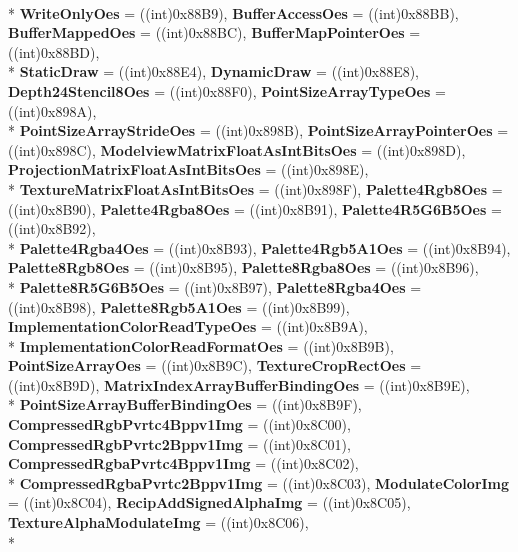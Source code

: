 \begin{DoxyCompactItemize}
\\*
{\bfseries Write\-Only\-Oes} = ((int)0x88\-B9), 
{\bfseries Buffer\-Access\-Oes} = ((int)0x88\-B\-B), 
{\bfseries Buffer\-Mapped\-Oes} = ((int)0x88\-B\-C), 
{\bfseries Buffer\-Map\-Pointer\-Oes} = ((int)0x88\-B\-D), 
\\*
{\bfseries Static\-Draw} = ((int)0x88\-E4), 
{\bfseries Dynamic\-Draw} = ((int)0x88\-E8), 
{\bfseries Depth24\-Stencil8\-Oes} = ((int)0x88\-F0), 
{\bfseries Point\-Size\-Array\-Type\-Oes} = ((int)0x898\-A), 
\\*
{\bfseries Point\-Size\-Array\-Stride\-Oes} = ((int)0x898\-B), 
{\bfseries Point\-Size\-Array\-Pointer\-Oes} = ((int)0x898\-C), 
{\bfseries Modelview\-Matrix\-Float\-As\-Int\-Bits\-Oes} = ((int)0x898\-D), 
{\bfseries Projection\-Matrix\-Float\-As\-Int\-Bits\-Oes} = ((int)0x898\-E), 
\\*
{\bfseries Texture\-Matrix\-Float\-As\-Int\-Bits\-Oes} = ((int)0x898\-F), 
{\bfseries Palette4\-Rgb8\-Oes} = ((int)0x8\-B90), 
{\bfseries Palette4\-Rgba8\-Oes} = ((int)0x8\-B91), 
{\bfseries Palette4\-R5\-G6\-B5\-Oes} = ((int)0x8\-B92), 
\\*
{\bfseries Palette4\-Rgba4\-Oes} = ((int)0x8\-B93), 
{\bfseries Palette4\-Rgb5\-A1\-Oes} = ((int)0x8\-B94), 
{\bfseries Palette8\-Rgb8\-Oes} = ((int)0x8\-B95), 
{\bfseries Palette8\-Rgba8\-Oes} = ((int)0x8\-B96), 
\\*
{\bfseries Palette8\-R5\-G6\-B5\-Oes} = ((int)0x8\-B97), 
{\bfseries Palette8\-Rgba4\-Oes} = ((int)0x8\-B98), 
{\bfseries Palette8\-Rgb5\-A1\-Oes} = ((int)0x8\-B99), 
{\bfseries Implementation\-Color\-Read\-Type\-Oes} = ((int)0x8\-B9\-A), 
\\*
{\bfseries Implementation\-Color\-Read\-Format\-Oes} = ((int)0x8\-B9\-B), 
{\bfseries Point\-Size\-Array\-Oes} = ((int)0x8\-B9\-C), 
{\bfseries Texture\-Crop\-Rect\-Oes} = ((int)0x8\-B9\-D), 
{\bfseries Matrix\-Index\-Array\-Buffer\-Binding\-Oes} = ((int)0x8\-B9\-E), 
\\*
{\bfseries Point\-Size\-Array\-Buffer\-Binding\-Oes} = ((int)0x8\-B9\-F), 
{\bfseries Compressed\-Rgb\-Pvrtc4\-Bppv1\-Img} = ((int)0x8\-C00), 
{\bfseries Compressed\-Rgb\-Pvrtc2\-Bppv1\-Img} = ((int)0x8\-C01), 
{\bfseries Compressed\-Rgba\-Pvrtc4\-Bppv1\-Img} = ((int)0x8\-C02), 
\\*
{\bfseries Compressed\-Rgba\-Pvrtc2\-Bppv1\-Img} = ((int)0x8\-C03), 
{\bfseries Modulate\-Color\-Img} = ((int)0x8\-C04), 
{\bfseries Recip\-Add\-Signed\-Alpha\-Img} = ((int)0x8\-C05), 
{\bfseries Texture\-Alpha\-Modulate\-Img} = ((int)0x8\-C06), 
\\*

\end{DoxyCompactItemize}

